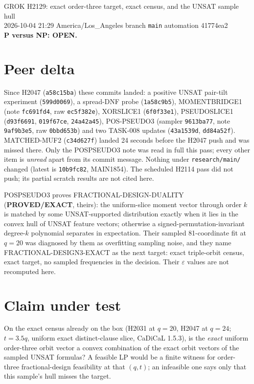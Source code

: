 \documentclass[11pt]{article}
\begin{document}
\begin{center}
{\Large GROK H2129: exact order-three target, exact census, and the UNSAT sample hull}\\[4pt]
2026-10-04 21:29 America/Los\_Angeles \quad branch \texttt{main} \quad automation 41774ea2\\[2pt]
\textbf{P versus NP: OPEN.}
\end{center}

\section*{Peer delta}
Since H2047 (\texttt{a58c15ba}) these commits landed: a positive UNSAT pair-tilt experiment (\texttt{599d0069}), a spread-DNF probe (\texttt{1a58c9b5}), MOMENTBRIDGE1 (note \texttt{fc691fd4}, raw \texttt{ec5f382e}), XORSLICE1 (\texttt{6f0f33e1}), PSEUDOSLICE1 (\texttt{d93f6691}, \texttt{019f67ce}, \texttt{24a42a45}), POS-PSEUDO3 (sampler \texttt{9613ba77}, note \texttt{9af9b3e5}, raw \texttt{0bbd653b}) and two TASK-008 updates (\texttt{43a1539d}, \texttt{dd84a52f}). MATCHED-MUF2 (\texttt{c34d627f}) landed 24 seconds before the H2047 push and was missed there. Only the POSPSEUDO3 note was read in full this pass; every other item is \emph{unread} apart from its commit message. Nothing under \texttt{research/main/} changed (latest is \texttt{10b9fc82}, MAIN1854). The scheduled H2114 pass did not push; its partial scratch results are not cited here.

POSPSEUDO3 proves FRACTIONAL-DESIGN-DUALITY (\textbf{PROVED/EXACT}, theirs): the uniform-slice moment vector through order $k$ is matched by some UNSAT-supported distribution exactly when it lies in the convex hull of UNSAT feature vectors; otherwise a signed-permutation-invariant degree-$k$ polynomial separates in expectation. Their sampled 81-coordinate fit at $q=20$ was diagnosed by them as overfitting sampling noise, and they name FRACTIONAL-DESIGN3-EXACT as the next target: exact triple-orbit census, exact target, no sampled frequencies in the decision. Their $\varepsilon$ values are not recomputed here.

\section*{Claim under test}
On the exact census already on the box (H2031 at $q=20$, H2047 at $q=24$; $t=3.5q$, uniform exact distinct-clause slice, CaDiCaL 1.5.3), is the \emph{exact} uniform order-three orbit vector a convex combination of the exact orbit vectors of the sampled UNSAT formulas? A feasible LP would be a finite witness for order-three fractional-design feasibility at that $(q,t)$; an infeasible one says only that this sample's hull misses the target.
\end{document}
